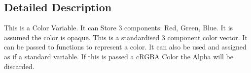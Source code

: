 \subsection{Detailed Description}
This is a Color Variable. It can Store 3 components: Red, Green, Blue. It is assumed the color is opaque. This is a standardised 3 component color vector. It can be passed to functions to represent a color. It can also be used and assigned as if a standard variable. If this is passed a \hyperlink{classc_r_g_b_a}{cRGBA} Color the Alpha will be discarded. 